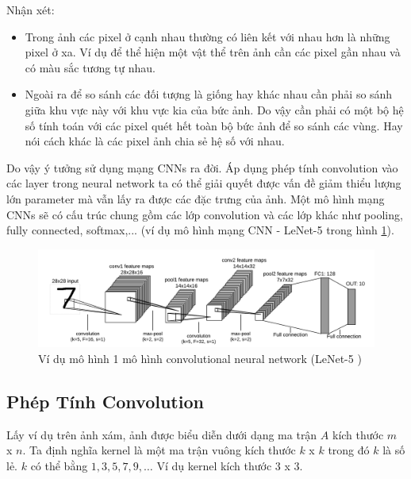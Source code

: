 Nhận xét:
\begin{itemize}
\item Trong ảnh các pixel ở cạnh nhau thường có liên kết với nhau hơn là những pixel ở xa. Ví dụ để thể hiện một vật thể trên ảnh cần các pixel gần nhau và có màu sắc tương tự nhau.
\item Ngoài ra để so sánh các đối tượng là giống hay khác nhau cần phải so sánh giữa khu vực này với khu vực kia của bức ảnh. Do vậy cần phải có một bộ hệ số tính toán với các pixel quét hết toàn bộ bức ảnh để so sánh các vùng. Hay nói cách khác là các pixel ảnh chia sẻ hệ số với nhau.
\end{itemize}
Do vậy ý tưởng sử dụng mạng CNNs ra đời. Áp dụng phép tính convolution vào các layer trong neural network ta có thể giải quyết được vấn đề giảm thiểu lượng lớn parameter mà vẫn lấy ra được các đặc trưng của ảnh. Một mô hình mạng CNNs sẽ có cấu trúc chung gồm các lớp convolution và các lớp khác như pooling, fully connected, softmax,... (ví dụ mô hình mạng CNN - LeNet-5 trong hình \ref{fig:lenet}).

\FloatBarrier
\begin{figure}[htp]
\begin{center}
\includegraphics[scale=1]{chap2/c2_figs/18.png}
\end{center}
\caption{Ví dụ mô hình 1 mô hình convolutional neural network (LeNet-5 \cite{lecun1998gradient})}
\label{fig:lenet}
\end{figure}
\FloatBarrier


\subsection{Phép Tính Convolution}
\label{ss: convolution}
Lấy ví dụ trên ảnh xám, ảnh được biểu diễn dưới dạng ma trận $A$ kích thước $m$ x $n$.
Ta định nghĩa kernel là một ma trận vuông kích thước $k$ x $k$ trong đó $k$ là số lẻ. $k$ có thể bằng $1, 3, 5, 7, 9,…$ Ví dụ kernel kích thước $3$ x $3$.

